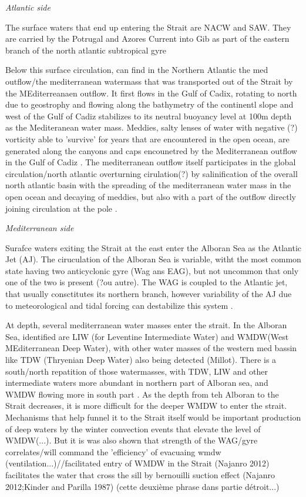 \textit{Atlantic side}

The surface waters that end up entering the Strait are NACW and SAW\citep{millot_2014,naranjo_2015}. They are carried by the Potrugal and Azores Current into Gib as part of the eastern branch of the north atlantic subtropical gyre \citep{barton_2001}

Below this surface circulation, can find in the Northern Atlantic the med outflow/the mediterranean watermass that was transported out of the Strait by the MEditerreanaen outflow. It first flows in the Gulf of Cadix, rotating to north due to geostrophy and flowing along the bathymetry of the continentl slope\citep{price_1993,gasser_2017} and west of the Gulf of Cadiz stabilizes to its neutral buoyancy level at 100m depth as the Mediteranean water mass\citep{price_1993}. Meddies, salty lenses of water with negative (?) vorticity able to 'survive' for years that are encountered in the open ocean, are generated along the canyons and caps encounetred by the Mediterranean outflow in the Gulf of Cadiz \citep{bashmachnikov_2015}. The mediterranean outflow itself participates in the global circulation/north atlantic overturning cirulation(?) by salinification of the overall north atlantic basin with the spreading of the mediterranean water mass in the open ocean and decaying of meddies, but also with a part of the outflow directly joining circulation at the pole \citep{price_1993,jia_2007}.


\textit{Mediterranean side}


Surafce waters exiting the Strait at the east enter the Alboran Sea as the Atlantic Jet (AJ). The ciruculation of the Alboran Sea is variable, witht the most common state having two anticyclonic gyre (Wag ans EAG), but not uncommon that only one of the two is present \citep{millot_2005}(?ou autre). The WAG is coupled to the Atlantic jet, that usually consctitutes its northern branch, however variability of the AJ due to meteorological and tidal forcing can destabilize this system \citep{sanchez-garrido_2013,lorente_2019}.

At depth, several mediterranean water masses enter the strait. In the Alboran Sea, identified are LIW (for Leventine Intermediate Water) and WMDW(West MEditerranean Deep Water), with other water masses of the western med bassin like TDW (Thryenian Deep Water) also being detected (Millot). There is a south/north repatition of those watermasses, with TDW, LIW and other intermediate waters more abundant in northern part of Alboran sea, and WMDW flowing more in south part \citep{millot_2014}. As the depth from teh Alboran to the Strait decreases, it is more difficult for the deeper WMDW to enter the strait. Mechanisms that help funnel it to the Strait itself would be important production of deep waters by the winter convection events that elevate the level of WMDW(...). But it is was also shown that strength of the WAG/gyre correlates/will command the 'efficiency' of evacuaing wmdw (ventilation...)//facilitated entry of WMDW in the Strait (Najanro 2012) facilitates the water that cross the sill by bernouilli suction effect (Najanro 2012;Kinder and Parilla 1987) (cette deuxième phrase dans partie détroit...) 


